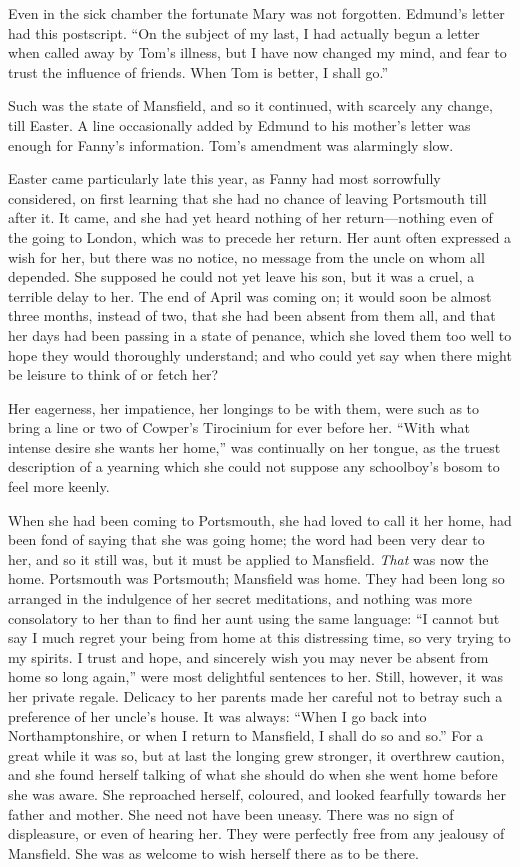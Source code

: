 Even in the sick chamber the fortunate Mary was
not forgotten.  Edmund's letter had this postscript.
``On the subject of my last, I had actually begun a letter
when called away by Tom's illness, but I have now changed
my mind, and fear to trust the influence of friends.
When Tom is better, I shall go.''

Such was the state of Mansfield, and so it continued,
with scarcely any change, till Easter.  A line occasionally
added by Edmund to his mother's letter was enough for
Fanny's information.  Tom's amendment was alarmingly slow.

Easter came particularly late this year, as Fanny had most
sorrowfully considered, on first learning that she had
no chance of leaving Portsmouth till after it.  It came,
and she had yet heard nothing of her return---nothing even
of the going to London, which was to precede her return.
Her aunt often expressed a wish for her, but there was
no notice, no message from the uncle on whom all depended.
She supposed he could not yet leave his son, but it was a cruel,
a terrible delay to her.  The end of April was coming on;
it would soon be almost three months, instead of two,
that she had been absent from them all, and that her days
had been passing in a state of penance, which she loved
them too well to hope they would thoroughly understand;
and who could yet say when there might be leisure to think
of or fetch her?

Her eagerness, her impatience, her longings to be with them,
were such as to bring a line or two of Cowper's Tirocinium
for ever before her.  ``With what intense desire she wants
her home,'' was continually on her tongue, as the truest
description of a yearning which she could not suppose
any schoolboy's bosom to feel more keenly.

When she had been coming to Portsmouth, she had loved to call
it her home, had been fond of saying that she was going home;
the word had been very dear to her, and so it still was,
but it must be applied to Mansfield.  \emph{That} was now
the home.  Portsmouth was Portsmouth; Mansfield was home.
They had been long so arranged in the indulgence of her
secret meditations, and nothing was more consolatory
to her than to find her aunt using the same language:
``I cannot but say I much regret your being from home
at this distressing time, so very trying to my spirits.
I trust and hope, and sincerely wish you may never be absent
from home so long again,'' were most delightful sentences
to her.  Still, however, it was her private regale.
Delicacy to her parents made her careful not to betray
such a preference of her uncle's house.  It was always:
``When I go back into Northamptonshire, or when I return
to Mansfield, I shall do so and so.''  For a great
while it was so, but at last the longing grew stronger,
it overthrew caution, and she found herself talking of what
she should do when she went home before she was aware.
She reproached herself, coloured, and looked fearfully towards
her father and mother.  She need not have been uneasy.
There was no sign of displeasure, or even of hearing her.
They were perfectly free from any jealousy of Mansfield.
She was as welcome to wish herself there as to be there.

